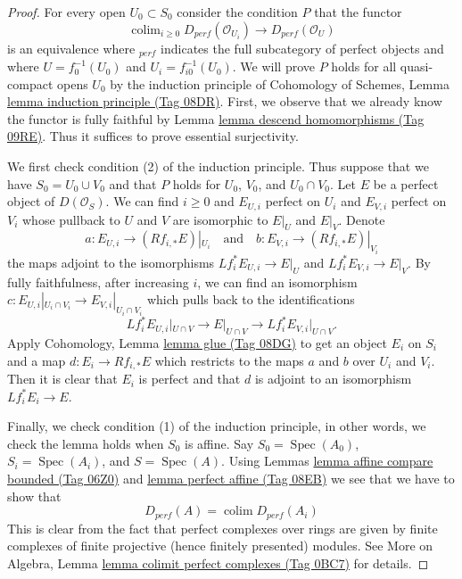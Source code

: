 \documentclass{amsart}
\theoremstyle{plain}
\theoremstyle{definition}
\theoremstyle{remark}
\numberwithin{equation}{subsection}
\def\colim{\mathop{\mathrm{colim}}\nolimits}
\def\Spec{\mathop{\mathrm{Spec}}}
\begin{document}
\begin{proof}
For every open $U_0 \subset S_0$ consider the condition $P$ that
the functor
$$
\colim_{i \geq 0} D_{perf}(\mathcal{O}_{U_i})
\longrightarrow
D_{perf}(\mathcal{O}_U)
$$
is an equivalence where ${}_{perf}$ indicates the full subcategory of
perfect objects and where $U = f_0^{-1}(U_0)$ and $U_i = f_{i0}^{-1}(U_0)$.
We will prove $P$ holds for all quasi-compact opens $U_0$
by the induction principle of
Cohomology of Schemes, Lemma \href{https://stacks.math.columbia.edu/tag/08DR}{lemma induction principle (Tag 08DR)}.
First, we observe that we already know the functor is fully faithful
by Lemma \href{https://stacks.math.columbia.edu/tag/09RE}{lemma descend homomorphisms (Tag 09RE)}. Thus it suffices to prove
essential surjectivity.

\medskip\noindent
We first check condition (2) of the induction principle. Thus suppose
that we have $S_0 = U_0 \cup V_0$ and that $P$ holds for
$U_0$, $V_0$, and $U_0 \cap V_0$. Let $E$ be a perfect object
of $D(\mathcal{O}_S)$. We can find $i \geq 0$ and $E_{U, i}$ perfect on $U_i$
and $E_{V, i}$ perfect on $V_i$ whose pullback to $U$ and $V$ are isomorphic
to $E|_U$ and $E|_V$. Denote
$$
a : E_{U, i} \to (Rf_{i, *}E)|_{U_i}
\quad\text{and}\quad
b : E_{V, i} \to (Rf_{i, *}E)|_{V_i}
$$
the maps adjoint to the isomorphisms $Lf_i^*E_{U, i} \to E|_U$
and $Lf_i^*E_{V, i} \to E|_V$.
By fully faithfulness, after increasing $i$,
we can find an isomorphism
$c : E_{U, i}|_{U_i \cap V_i} \to E_{V, i}|_{U_i \cap V_i}$
which pulls back to the identifications 
$$
Lf_i^*E_{U, i}|_{U \cap V} \to E|_{U \cap V} \to Lf_i^*E_{V, i}|_{U \cap V}.
$$
Apply Cohomology, Lemma \href{https://stacks.math.columbia.edu/tag/08DG}{lemma glue (Tag 08DG)}
to get an object $E_i$ on $S_i$ and a map $d : E_i \to Rf_{i, *}E$
which restricts to the maps $a$ and $b$ over $U_i$ and $V_i$.
Then it is clear that $E_i$ is perfect and that
$d$ is adjoint to an isomorphism $Lf_i^*E_i \to E$.

\medskip\noindent
Finally, we check condition (1) of the induction principle, in other
words, we check the lemma holds when $S_0$ is affine.
Say $S_0 = \Spec(A_0)$, $S_i = \Spec(A_i)$, and
$S = \Spec(A)$. Using Lemmas \href{https://stacks.math.columbia.edu/tag/06Z0}{lemma affine compare bounded (Tag 06Z0)}
and \href{https://stacks.math.columbia.edu/tag/08EB}{lemma perfect affine (Tag 08EB)} we see that we have to show that
$$
D_{perf}(A) = \colim D_{perf}(A_i)
$$
This is clear from the fact that perfect complexes over rings are
given by finite complexes of finite projective (hence finitely presented)
modules. See More on Algebra, Lemma
\href{https://stacks.math.columbia.edu/tag/0BC7}{lemma colimit perfect complexes (Tag 0BC7)} for details.
\end{proof}
\end{document}
